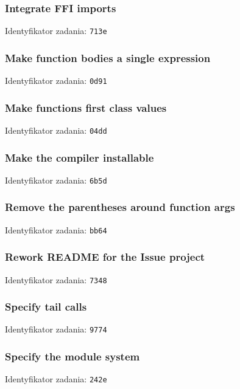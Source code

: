 \subsubsection{Integrate FFI imports}

Identyfikator zadania: \texttt{713e}

\subsubsection{Make function bodies a single expression}

Identyfikator zadania: \texttt{0d91}

\subsubsection{Make functions first class values}

Identyfikator zadania: \texttt{04dd}

\subsubsection{Make the compiler installable}

Identyfikator zadania: \texttt{6b5d}

\subsubsection{Remove the parentheses around function args}

Identyfikator zadania: \texttt{bb64}

\subsubsection{Rework README for the Issue project}

Identyfikator zadania: \texttt{7348}

\subsubsection{Specify tail calls}

Identyfikator zadania: \texttt{9774}

\subsubsection{Specify the module system}

Identyfikator zadania: \texttt{242e}

